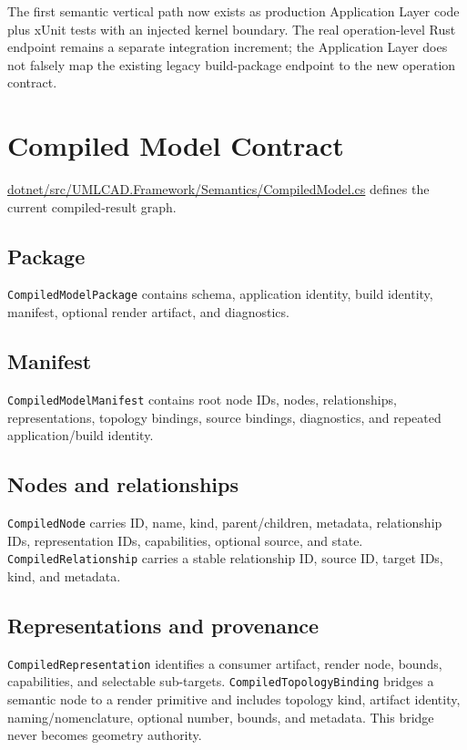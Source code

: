 \documentclass[11pt,a4paper]{report}
\newcommand{\pathref}[1]{\url{#1}}
\begin{document}
The first semantic vertical path now exists as production Application Layer code plus xUnit tests with an injected kernel boundary. The real operation-level Rust endpoint remains a separate integration increment; the Application Layer does not falsely map the existing legacy build-package endpoint to the new operation contract.


\chapter{Compiled Model Contract}

\pathref{dotnet/src/UMLCAD.Framework/Semantics/CompiledModel.cs} defines the current compiled-result graph.

\section{Package}
\texttt{CompiledModelPackage} contains schema, application identity, build identity, manifest, optional render artifact, and diagnostics.

\section{Manifest}
\texttt{CompiledModelManifest} contains root node IDs, nodes, relationships, representations, topology bindings, source bindings, diagnostics, and repeated application/build identity.

\section{Nodes and relationships}
\texttt{CompiledNode} carries ID, name, kind, parent/children, metadata, relationship IDs, representation IDs, capabilities, optional source, and state. \texttt{CompiledRelationship} carries a stable relationship ID, source ID, target IDs, kind, and metadata.

\section{Representations and provenance}
\texttt{CompiledRepresentation} identifies a consumer artifact, render node, bounds, capabilities, and selectable sub-targets. \texttt{CompiledTopologyBinding} bridges a semantic node to a render primitive and includes topology kind, artifact identity, naming/nomenclature, optional number, bounds, and metadata. This bridge never becomes geometry authority.
\end{document}
